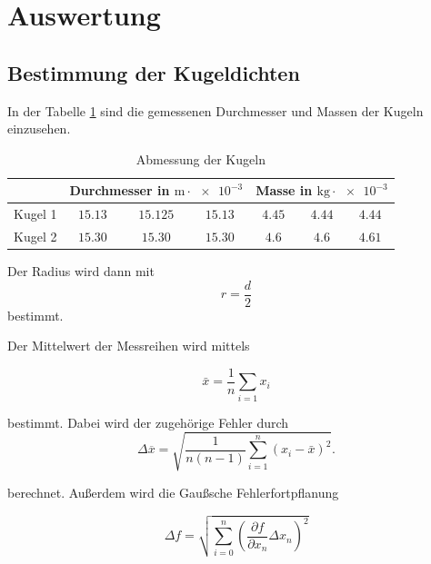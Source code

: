 \section{Auswertung}


\subsection{Bestimmung der Kugeldichten}

In der Tabelle \ref{tab:messwerte_kugel} sind die gemessenen
Durchmesser und Massen der Kugeln einzusehen.

\begin{table}
\centering
\begin{tabular} {ccccccc} %
	\toprule
  & \multicolumn{3}{c}{Durchmesser in $\si{\meter}\cdot \num{e-3}$}  & \multicolumn{3}{c}{Masse in $\si{\kilogram}\cdot \num{e-3}$} \\
\midrule 
Kugel 1 & $\num{15.13} $&  $\num{15.125} $ & $\num{15.13} $  & $\num{4.45}$ & $\num{4.44} $ & $\num{4.44} $ \\
Kugel 2  & $\num{15.30} $&  $\num{15.30} $ & $\num{15.30} $ & $\num{4.6}$ & $\num{4.6} $ & $\num{4.61} $ \\
\bottomrule
\end{tabular}
\caption{Abmessung der Kugeln}
\label{tab:messwerte_kugel}
\end{table}

Der Radius wird dann mit
\begin{equation*}
r=\frac{d}{2}
\end{equation*}
bestimmt.

Der Mittelwert der Messreihen wird mittels

\begin{equation}
\label{eq:mittel}
\bar{x}=\frac{1}{n}\sum_{i=1}x_i
\end{equation}

bestimmt. Dabei wird der zugehörige Fehler
durch
\begin{equation}
\label{eq:stand_ab}
\Delta \overline{x}=\sqrt{\frac{1}{n(n-1)}\sum_{i=1}^{n}(x_i-\bar{x})^2}.
\end{equation}

berechnet.
Außerdem wird die Gaußsche Fehlerfortpflanung

\begin{equation}
\label{eq:gauss}
\Delta f=\sqrt{\sum_{i=0}^n\left(\frac{\partial f}{\partial x_n} \Delta x_n\right)^2}
\end{equation}


